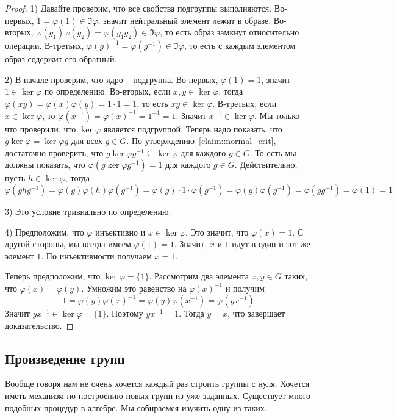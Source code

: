 \begin{proof}
1) Давайте проверим, что все свойства подгруппы выполняются.
Во-первых, $1 = \varphi(1) \in \Im \varphi$, значит нейтральный элемент лежит в образе.
Во-вторых, $\varphi(g_1)\varphi(g_2) = \varphi(g_1 g_2) \in \Im\varphi$, то есть образ замкнут относительно операции.
В-третьих, $\varphi(g)^{-1} = \varphi(g^{-1}) \in \Im\varphi$, то есть с каждым элементом образ содержит его обратный.

2) В начале проверим, что ядро -- подгруппа.
Во-первых, $\varphi(1) = 1$, значит $1 \in \ker \varphi$ по определению.
Во-вторых, если $x, y\in \ker \varphi$, тогда $\varphi(xy) = \varphi(x) \varphi(y) = 1\cdot 1 = 1$, то есть $xy\in \ker\varphi$.
В-третьих, если $x\in \ker\varphi$, то $\varphi(x^{-1}) = \varphi(x)^{-1} = 1^{-1} = 1$.
Значит $x^{-1}\in \ker\varphi$.
Мы только что проверили, что $\ker \varphi$ является подгруппой.
Теперь надо показать, что $g \ker \varphi = \ker \varphi g$ для всех $g\in G$.
По утверждению~\ref{claim::normal_crit}, достаточно проверить, что $g\ker \varphi g^{-1}\subseteq \ker \varphi$ для каждого $g\in G$.
То есть мы должны показать, что $\varphi(g \ker \varphi g^{-1}) = 1$ для каждого $g\in G$.
Действительно, пусть $h\in \ker \varphi$, тогда
\[
\varphi(g h g^{-1}) = \varphi(g) \varphi(h) \varphi(g^{-1}) = \varphi(g) \cdot 1 \cdot \varphi(g^{-1}) = \varphi(g) \varphi(g^{-1}) = \varphi(g g^{-1}) = \varphi(1) = 1
\]

3) Это условие тривиально по определению.

4) Предположим, что $\varphi$ инъективно и $x\in \ker\varphi$.
Это значит, что $\varphi(x) = 1$.
С другой стороны, мы всегда имеем $\varphi(1) = 1$.
Значит, $x$ и $1$ идут в один и тот же элемент $1$.
По инъективности получаем $x = 1$.

Теперь предположим, что $\ker \varphi = \{1\}$.
Рассмотрим два элемента $x, y\in G$ таких, что $\varphi(x) = \varphi(y)$.
Умножим это равенство на $\varphi(x)^{-1}$ и получим
\[
1 = \varphi(y) \varphi(x)^{-1} = \varphi(y) \varphi(x^{-1}) = \varphi(yx^{-1})
\]
Значит $yx^{-1}\in\ker\varphi = \{1\}$.
Поэтому $y x^{-1} = 1$.
Тогда $y = x$, что завершает доказательство.
\end{proof}

\subsection{Произведение групп}

Вообще говоря нам не очень хочется каждый раз строить группы с нуля.
Хочется иметь механизм по построению новых групп из уже заданных.
Существует много подобных процедур в алгебре.
Мы собираемся изучить одну из таких.

